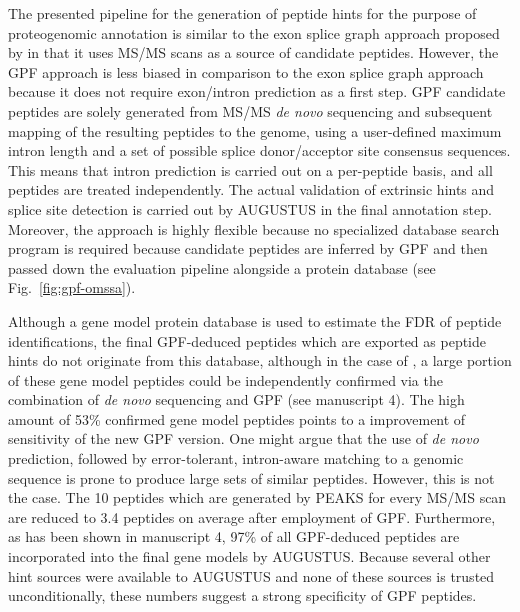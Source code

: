 The presented pipeline for the generation of peptide hints for the purpose of
proteogenomic annotation is similar to the exon splice graph approach proposed
by \citeauthor{Tanner2007} in that it uses MS/MS scans as a source of candidate
peptides.
However, the GPF approach is less biased in comparison to the exon splice graph
approach because it does not require exon/intron prediction as a first step.
GPF candidate peptides are solely generated from MS/MS {\em de novo} sequencing
and subsequent mapping of the resulting peptides to the genome, using a 
user-defined maximum intron length and a set of possible splice donor/acceptor 
site consensus sequences.
This means that intron prediction is carried out on a per-peptide basis, and
all peptides are treated independently.
The actual validation of extrinsic hints and splice site detection is
carried out by AUGUSTUS in the final annotation step.
Moreover, the approach is highly flexible because no specialized database
search program is required because candidate peptides are inferred by GPF
and then passed down the evaluation pipeline alongside a protein database
(see Fig.~\ref{fig:gpf-omssa}).


Although a gene model protein database is used to estimate the FDR of peptide 
identifications, the final GPF-deduced peptides which are exported as
peptide hints do not originate from this database, although in the case
of \cre, a large portion of these gene model peptides could be 
independently confirmed via the combination of {\em de novo} sequencing and 
GPF (see manuscript 4).
The high amount of 53\% confirmed gene model peptides points to a improvement 
of sensitivity of the new GPF version.
One might argue that the use of {\em de novo} prediction, followed by
error-tolerant, intron-aware matching to a genomic sequence is prone to
produce large sets of similar peptides.
However, this is not the case.
The 10 peptides which are generated by PEAKS for every MS/MS scan are 
reduced to 3.4 peptides on average after employment of GPF.
Furthermore, as has been shown in manuscript 4, 97\% of all GPF-deduced 
peptides are incorporated into the final gene models by AUGUSTUS.
Because several other hint sources were available to AUGUSTUS and none of
these sources is trusted unconditionally, these numbers suggest a strong 
specificity of GPF peptides.

